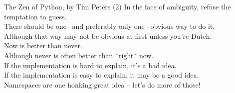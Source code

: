 \documentclass{beamer}
\begin{document}
\begin{frame}{The Zen of Python, by Tim Peters (2)}
In the face of ambiguity, refuse the temptation to guess.\\
There should be one-- and preferably only one --obvious way to do it.\\
Although that way may not be obvious at first unless you're Dutch.\\
Now is better than never.\\
Although never is often better than *right* now.\\
If the implementation is hard to explain, it's a bad idea.\\
If the implementation is easy to explain, it may be a good idea.\\
Namespaces are one honking great idea -- let's do more of those!
\end{frame}
\end{document}

